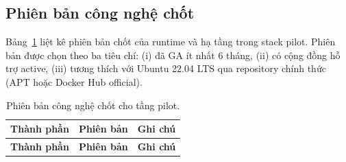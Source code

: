 \subsection{Phiên bản công nghệ chốt}
\label{subsec:tech-versions}

Bảng~\ref{tab:tech-versions} liệt kê phiên bản chốt của runtime và hạ
tầng trong stack pilot. Phiên bản được chọn theo ba tiêu chí: (i) đã
GA ít nhất 6 tháng, (ii) có cộng đồng hỗ trợ active, (iii) tương thích
với Ubuntu 22.04 LTS qua repository chính thức (APT hoặc Docker Hub
official).

\begin{longtable}{|p{4.3cm}|p{3.7cm}|p{5.5cm}|}
\caption{Phiên bản công nghệ chốt cho tầng pilot.}
\label{tab:tech-versions} \\
\hline
\textbf{Thành phần} & \textbf{Phiên bản} & \textbf{Ghi chú} \\
\hline
\endfirsthead
\hline
\textbf{Thành phần} & \textbf{Phiên bản} & \textbf{Ghi chú} \\
\hline
\endhead


\end{longtable}
